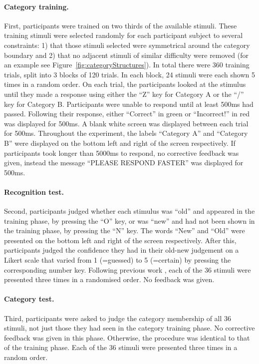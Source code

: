 \documentclass[12pt]{article}
\begin{document}
\paragraph{Category training.} First, participants were trained on two thirds
of the available stimuli. These training stimuli were selected randomly for
each participant subject to several constraints: 1) that those stimuli selected
were symmetrical around the category boundary and 2) that no adjacent stimuli
of similar difficulty were removed (for an example see
Figure~\ref{fig:categoryStructures}).  In total there were 360 training trials, split
into 3 blocks of 120 trials.  In each block, 24 stimuli were each shown 5 times
in a random order.  On each trial, the participants looked at the stimulus
until they made a response using either the ``Z'' key for Category A or the
``/'' key for Category B.  Participants were unable to respond until at least
500ms had passed. Following their response, either ``Correct'' in green or ``Incorrect!'' in red
was displayed for 500ms.  A blank white screen was displayed between each trial
for 500ms.  Throughout the experiment, the labels ``Category A'' and ``Category
B'' were displayed on the bottom left and right of the screen respectively.  If
participants took longer than 5000ms to respond, no corrective feedback was
given, instead the message ``PLEASE RESPOND FASTER'' was displayed for 500ms.

\paragraph{Recognition test.} Second, participants judged whether each stimulus
was ``old'' and appeared in the training phase, by pressing the ``O'' key, or
was ``new'' and had not been shown in the training phase, by pressing the ``N''
key.  The words ``New'' and ``Old'' were presented on the bottom left and right
of the screen respectively.  After this, participants judged the confidence
they had in their old-new judgement on a Likert scale that varied from 1
(=guessed) to 5 (=certain) by pressing the corresponding number key.  Following previous work \cite{Palmeri1995}, each of
the 36 stimuli were presented three times in a randomised order.  No feedback
was given.

\paragraph{Category test.} Third, participants were asked to judge the
category membership of all 36 stimuli, not just those they had seen in the
category training phase.  No corrective feedback was given in this phase.
Otherwise, the procedure was identical to that of the training phase.  Each of
the 36 stimuli were presented three times in a random order.
\end{document}
